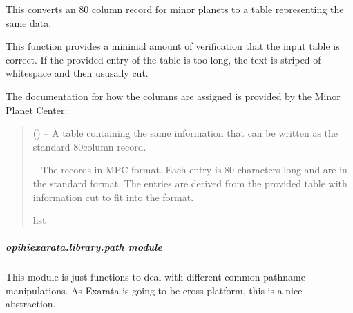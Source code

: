 \documentclass[letterpaper,11pt,english]{sphinxmanual}
\begin{document}
\begin{savenotes}\begin{fulllineitems}
\label{\detokenize{code/opihiexarata.library.mpcrecord:opihiexarata.library.mpcrecord.minor_planet_table_to_record}}
\pysigstartsignatures
{}
\pysigstopsignatures
\sphinxAtStartPar
This converts an 80 column record for minor planets to a table
representing the same data.

\sphinxAtStartPar
This function provides a minimal amount of verification that the input
table is correct. If the provided entry of the table is too long, the text
is striped of whitespace and then ususally cut.

\sphinxAtStartPar
The documentation for how the columns are assigned is provided by the
Minor Planet Center:
\begin{quote}\begin{description}
\sphinxAtStartPar
{} () – A table containing the same information that can be written as the
standard 80\sphinxhyphen{}column record.

\sphinxAtStartPar
{} – The records in MPC format. Each entry is 80 characters long and are in
the standard format. The entries are derived from the provided table
with information cut to fit into the format.

\sphinxAtStartPar
list

\end{description}\end{quote}

\end{fulllineitems}\end{savenotes}


\sphinxstepscope


\subparagraph{opihiexarata.library.path module}
\label{\detokenize{code/opihiexarata.library.path:module-opihiexarata.library.path}}\label{\detokenize{code/opihiexarata.library.path:opihiexarata-library-path-module}}\label{\detokenize{code/opihiexarata.library.path::doc}}
\sphinxAtStartPar
This module is just functions to deal with different common pathname manipulations.
As Exarata is going to be cross platform, this is a nice abstraction.
\end{document}
